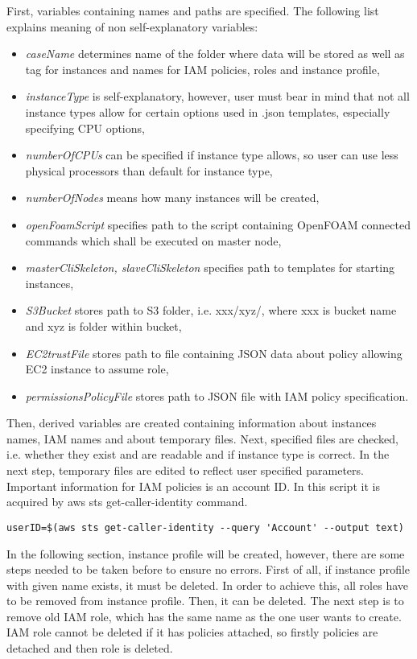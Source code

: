 \documentclass[11pt,english]{article}
\begin{document}
First, variables containing names and paths are specified. The following list explains meaning of non self-explanatory variables:
\begin{itemize}
	\item \textit{caseName} determines name of the folder where data will be stored as well as tag for instances and names for IAM policies, roles and instance profile,
	\item \textit{instanceType} is self-explanatory, however, user must bear in mind that not all instance types allow for certain options used in .json templates, especially specifying CPU options,
	\item \textit{numberOfCPUs} can be specified if instance type allows, so user can use less physical processors than default for instance type,
	\item \textit{numberOfNodes} means how many instances will be created,
	\item \textit{openFoamScript} specifies path to the script containing OpenFOAM connected commands which shall be executed on master node,
	\item \textit{masterCliSkeleton, slaveCliSkeleton} specifies path to templates for starting instances,
	\item \textit{S3Bucket} stores path to S3 folder, i.e. xxx/xyz/, where xxx is bucket name and xyz is folder within bucket,
	\item \textit{EC2trustFile} stores path to file containing JSON data about policy allowing EC2 instance to assume role,
	\item \textit{permissionsPolicyFile} stores path to JSON file with IAM policy specification.
\end{itemize}
Then, derived variables are created containing information about instances names, IAM names and about temporary files. Next, specified files are checked, i.e. whether they exist and are readable and if instance type is correct.
In the next step, temporary files are edited to reflect user specified parameters. Important information for IAM policies is an account ID. In this script it is acquired by aws sts get-caller-identity command.
\begin{lstlisting}
userID=$(aws sts get-caller-identity --query 'Account' --output text)
\end{lstlisting}
In the following section, instance profile will be created, however, there are some steps needed to be taken before to ensure no errors. First of all, if instance profile with given name exists, it must be deleted. In order to achieve this, all roles have to be removed from instance profile. Then, it can be deleted. The next step is to remove old IAM role, which has the same name as the one user wants to create. IAM role cannot be deleted if it has policies attached, so firstly policies are detached and then role is deleted. 
\end{document}
